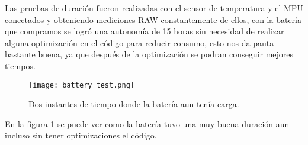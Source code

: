 Las pruebas de duración fueron realizadas con el sensor de temperatura y el MPU conectados y obteniendo mediciones RAW
constantemente de ellos, con la batería que compramos se logró una autonomía de 15 horas sin necesidad de realizar alguna
optimización en el código para reducir consumo, esto nos da pauta bastante buena, ya que después de la optimización se
podran conseguir mejores tiempos.

\begin{figure}[htp!]
    \centering
    \texttt{[image: battery\_test.png]}
    \caption{Dos instantes de tiempo donde la batería aun tenía carga. }
    \label{fig: battery_test}
\end{figure}
\FloatBarrier

En la figura \ref{fig: battery_test} se puede ver como la batería tuvo una muy buena duración aun incluso sin tener optimizaciones
el código.

